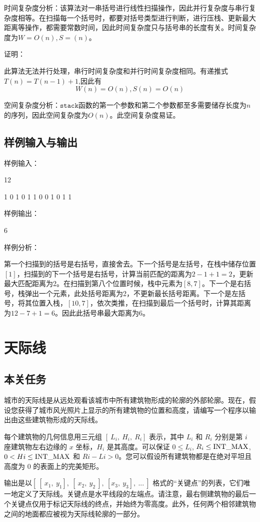 \documentclass[UTF8,a4paperdui, %
]{ctexart}
\begin{document}
时间复杂度分析：该算法对一串括号进行线性扫描操作，因此并行复杂度与串行复杂度相等。在扫描每一个括号时，都要对括号类型进行判断，进行压栈、更新最大距离等操作，都需要常数时间，因此时间复杂度只与括号串的长度有关。时间复杂度为$W=O(n),S=(n)$。

证明：

此算法无法并行处理，串行时间复杂度和并行时间复杂度相同。有递推式$T(n)=T(n-1)+1$,因此有
\[
	W(n)=O(n),S(n)=O(n)
\]

空间复杂度分析：$\texttt{stack}$函数的第一个参数和第二个参数都至多需要储存长度为$n$的序列，因此空间复杂度为$O(n)$。此空间复杂度易证。

\subsection{样例输入与输出}
样例输入：

12 

1 0 1 0 1 1 0 0 1 0 1 1

样例输出：

6

样例分析：

第一个扫描到的括号是右括号，直接舍去。下一个括号是左括号，在栈中储存位置$[1]$，扫描到的下一个括号是右括号，计算当前匹配的距离为$2-1+1=2$，更新最大匹配距离为2。在扫描到第八个位置时候，栈中元素为$[8,7]$。下一个是右括号，栈弹出一个元素，此处括号距离为2，不更新最长括号距离。下一个是左括号，将其位置入栈，$[10,7]$，依次类推，在扫描到最后一个括号时，计算其距离为$12-7+1=6$。因此此括号串最大距离为6。
\section{天际线}
\subsection{本关任务}
城市的天际线是从远处观看该城市中所有建筑物形成的轮廓的外部轮廓。现在，假设您获得了城市风光照片上显示的所有建筑物的位置和高度，请编写一个程序以输出由这些建筑物形成的天际线。

每个建筑物的几何信息用三元组 $[\ L_i,\ H_i,\ R_i]$ 表示，其中 $L_i$ 和 $R_i$ 分别是第 $i$ 座建筑物左右边缘的 $x$ 坐标，$H_i$ 是其高度。可以保证 $0 \leq L_i$, $R_i \leq  {\rm INT\_MAX}$, $0 < Hi \leq  {\rm INT\_MAX}$ 和 $Ri - Li > 0$。您可以假设所有建筑物都是在绝对平坦且高度为 0 的表面上的完美矩形。

输出是以$[\ [\ x_1,\ y_1],\ [\ x_2,\ y_2\ ],\ [x_3,\ y_3],\ ...\ ]$ 格式的“关键点”的列表，它们唯一地定义了天际线。关键点是水平线段的左端点。请注意，最右侧建筑物的最后一个关键点仅用于标记天际线的终点，并始终为零高度。此外，任何两个相邻建筑物之间的地面都应被视为天际线轮廓的一部分。
\end{document}
